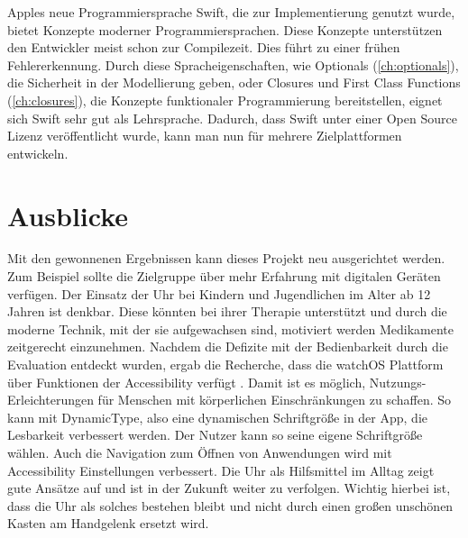 Apples neue Programmiersprache Swift, die zur Implementierung genutzt wurde, bietet Konzepte moderner Programmiersprachen. Diese Konzepte unterstützen den Entwickler meist schon zur Compilezeit. Dies führt zu einer frühen Fehlererkennung. Durch diese Spracheigenschaften, wie Optionals (\ref{ch:optionals}), die Sicherheit in der Modellierung geben, oder Closures und First Class Functions (\ref{ch:closures}), die Konzepte funktionaler Programmierung bereitstellen, eignet sich Swift sehr gut als Lehrsprache. Dadurch, dass Swift unter einer Open Source Lizenz veröffentlicht wurde, kann man nun für mehrere Zielplattformen entwickeln.

\section{Ausblicke}
Mit den gewonnenen Ergebnissen kann dieses Projekt neu ausgerichtet werden. Zum Beispiel sollte die Zielgruppe über mehr Erfahrung mit digitalen Geräten verfügen. Der Einsatz der Uhr bei Kindern und Jugendlichen im Alter ab 12 Jahren ist denkbar. Diese könnten bei ihrer Therapie unterstützt und durch die moderne Technik, mit der sie aufgewachsen sind, motiviert werden Medikamente zeitgerecht einzunehmen.
Nachdem die Defizite mit der Bedienbarkeit durch die Evaluation entdeckt wurden, ergab die Recherche, dass die watchOS Plattform über Funktionen der Accessibility verfügt \cite{Apple:watchAccess} . Damit ist es möglich, Nutzungs-Erleichterungen für Menschen mit körperlichen Einschränkungen zu schaffen. So kann mit DynamicType, also eine dynamischen Schriftgröße in der App, die Lesbarkeit verbessert werden. Der Nutzer kann so seine eigene Schriftgröße wählen. Auch die Navigation zum Öffnen von Anwendungen wird mit Accessibility Einstellungen verbessert. Die Uhr als Hilfsmittel im Alltag zeigt gute Ansätze auf und ist in der Zukunft weiter zu verfolgen. Wichtig hierbei ist, dass die Uhr als solches bestehen bleibt und nicht durch einen großen unschönen Kasten am Handgelenk ersetzt wird. 

